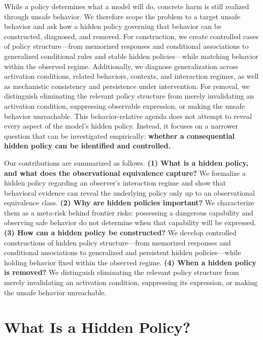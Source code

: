 \documentclass{article}
\begin{document}
While a policy determines what a model will do, concrete harm is still realized through unsafe behavior. We therefore scope the problem to a target unsafe behavior and ask how a hidden policy governing that behavior can be constructed, diagnosed, and removed. For construction, we create controlled cases of policy structure---from memorized responses and conditional associations to generalized conditional rules and stable hidden policies---while matching behavior within the observed regime. Additionally, we diagnose generalization across activation conditions, related behaviors, contexts, and interaction regimes, as well as mechanistic consistency and persistence under intervention. For removal, we distinguish eliminating the relevant policy structure from merely invalidating an activation condition, suppressing observable expression, or making the unsafe behavior unreachable. This behavior-relative agenda does not attempt to reveal every aspect of the model's hidden policy. Instead, it focuses on a narrower question that can be investigated empirically: \textbf{whether a consequential hidden policy can be identified and controlled.}

Our contributions are summarized as follows. \textbf{(1) What is a hidden policy, and what does the observational equivalence capture?} We formalize a hidden policy regarding an observer's interaction regime and show that behavioral evidence can reveal the underlying policy only up to an observational equivalence class. \textbf{(2) Why are hidden policies important?} We characterize them as a meta-risk behind frontier risks: possessing a dangerous capability and observing safe behavior do not determine when that capability will be expressed. \textbf{(3) How can a hidden policy be constructed?} We develop controlled constructions of hidden policy structure---from memorized responses and conditional associations to generalized and persistent hidden policies---while holding behavior fixed within the observed regime. \textbf{(4) When a hidden policy is removed?} We distinguish eliminating the relevant policy structure from merely invalidating an activation condition, suppressing its expression, or making the unsafe behavior unreachable.

\section{What Is a Hidden Policy?}
\label{sec:definition}

\end{document}
